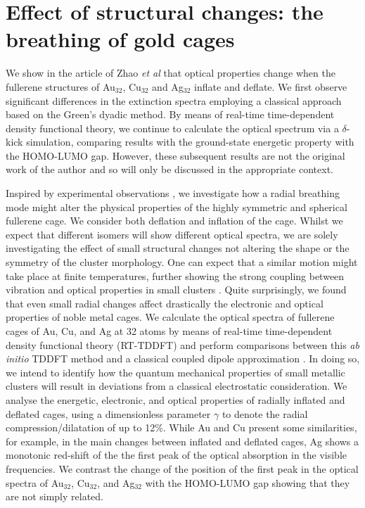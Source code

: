\section{Effect of structural changes: the breathing of gold cages}
\label{Pure}

We show in the article of Zhao \textit{et al} \cite{Wei} that optical properties change when the fullerene structures of Au$_{32}$, Cu$_{32}$ and Ag$_{32}$ inflate and deflate. We first observe significant differences in the extinction spectra employing a classical approach based on the Green's dyadic method. By means of real-time time-dependent density functional theory, we continue to calculate the optical spectrum via a $\delta$-kick simulation, comparing results with the ground-state energetic property with the HOMO-LUMO gap. However, these subsequent results are not the original work of the author and so will only be discussed in the appropriate context.

Inspired by experimental observations \cite{Maioli2018,Quasi_Breathe}, we investigate how a radial breathing mode might alter the physical properties of the highly symmetric and spherical fullerene cage. We consider both deflation and inflation of the cage. Whilst we expect that different isomers will show different optical spectra, we are solely investigating the effect of small structural changes not altering the shape or the symmetry of the cluster morphology. One can expect that a similar motion might take place at finite temperatures, further showing the strong coupling between vibration and optical properties in small clusters \cite{Liu2021}. Quite surprisingly, we found that even small radial changes affect drastically the electronic and optical properties of noble metal cages. We calculate the optical spectra of fullerene cages of Au, Cu, and Ag at 32 atoms by means of real-time time-dependent density functional theory (RT-TDDFT) and perform comparisons between this \textit{ab initio} TDDFT method and a classical coupled dipole approximation \cite{Ullrich2012}. In doing so, we intend to identify how the quantum mechanical properties of small metallic clusters will result in deviations from a classical electrostatic consideration. We analyse the energetic, electronic, and optical properties of radially inflated and deflated cages, using a dimensionless parameter $\gamma$ to denote the radial compression/dilatation of up to 12\%.
While Au and Cu present some similarities, for example, in the main changes between inflated and deflated cages, Ag shows a monotonic red-shift of the the first peak of the optical absorption in the visible frequencies. We contrast the change of the position of the first peak in the optical spectra of Au$_{32}$, Cu$_{32}$, and Ag$_{32}$ with the HOMO-LUMO gap showing that they are not simply related.

